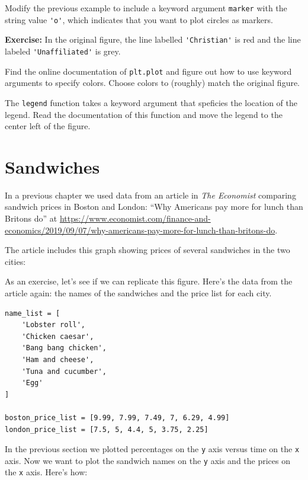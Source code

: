 Modify the previous example to include a keyword argument
\passthrough{\lstinline!marker!} with the string value
\passthrough{\lstinline!'o'!}, which indicates that you want to plot
circles as markers.

\textbf{Exercise:} In the original figure, the line labelled
\passthrough{\lstinline!'Christian'!} is red and the line labeled
\passthrough{\lstinline!'Unaffiliated'!} is grey.

Find the online documentation of \passthrough{\lstinline!plt.plot!} and
figure out how to use keyword arguments to specify colors. Choose colors
to (roughly) match the original figure.

The \passthrough{\lstinline!legend!} function takes a keyword argument
that speficies the location of the legend. Read the documentation of
this function and move the legend to the center left of the figure.

\hypertarget{sandwiches}{%
\section{Sandwiches}\label{sandwiches}}

In a previous chapter we used data from an article in \emph{The
Economist} comparing sandwich prices in Boston and London: ``Why
Americans pay more for lunch than Britons do'' at
\url{https://www.economist.com/finance-and-economics/2019/09/07/why-americans-pay-more-for-lunch-than-britons-do}.

The article includes this graph showing prices of several sandwiches in
the two cities:

As an exercise, let's see if we can replicate this figure. Here's the
data from the article again: the names of the sandwiches and the price
list for each city.

\begin{lstlisting}[]
name_list = [
    'Lobster roll',
    'Chicken caesar',
    'Bang bang chicken',
    'Ham and cheese',
    'Tuna and cucumber',
    'Egg'
]

boston_price_list = [9.99, 7.99, 7.49, 7, 6.29, 4.99]
london_price_list = [7.5, 5, 4.4, 5, 3.75, 2.25]
\end{lstlisting}

In the previous section we plotted percentages on the
\passthrough{\lstinline!y!} axis versus time on the
\passthrough{\lstinline!x!} axis. Now we want to plot the sandwich names
on the \passthrough{\lstinline!y!} axis and the prices on the
\passthrough{\lstinline!x!} axis. Here's how:

